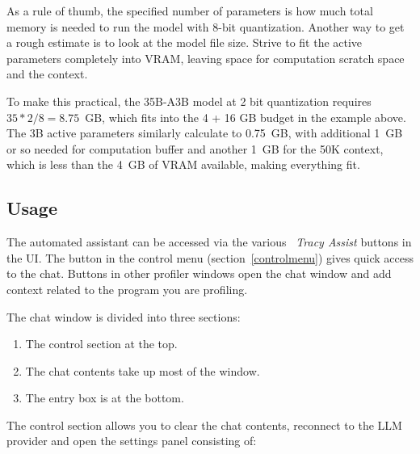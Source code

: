 \documentclass[hidelinks,titlepage,a4paper,twoside]{article}
\begin{document}
As a rule of thumb, the specified number of parameters is how much total memory is needed to run the model with 8-bit quantization. Another way to get a rough estimate is to look at the model file size. Strive to fit the active parameters completely into VRAM, leaving space for computation scratch space and the context.

To make this practical, the 35B-A3B model at 2 bit quantization requires $35 * 2 / 8 = 8.75$~GB, which fits into the 4 + 16 GB budget in the example above. The 3B active parameters similarly calculate to 0.75~GB, with additional 1~GB or so needed for computation buffer and another 1~GB for the 50K context, which is less than the 4~GB of VRAM available, making everything fit.

\subsection{Usage}
\label{llmusage}

The automated assistant can be accessed via the various \emph{\faRobot{}~Tracy Assist} buttons in the UI. The button in the control menu (section~\ref{controlmenu}) gives quick access to the chat. Buttons in other profiler windows open the chat window and add context related to the program you are profiling.

The chat window is divided into three sections:

\begin{enumerate}
\item The control section at the top.
\item The chat contents take up most of the window.
\item The entry box is at the bottom.
\end{enumerate}

The control section allows you to clear the chat contents, reconnect to the LLM provider and open the settings panel consisting of:
\end{document}
